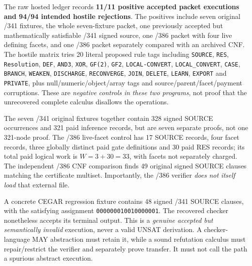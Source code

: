 \documentclass[11pt]{article}
\begin{document}
The raw hosted ledger records \textbf{11/11 positive accepted packet executions and 94/94 intended hostile rejections}. The positives include seven original /341 fixtures, the whole seven-fixture packet, one previously accepted but mathematically satisfiable /341 signed source, one /386 packet with four live defining facets, and one /386 packet separately compared with an archived CNF. The hostile matrix tries 20 literal proposed rule tags including \texttt{SOURCE}, \texttt{RES}, \texttt{Resolution}, \texttt{DEF}, \texttt{AND3}, \texttt{XOR}, \texttt{GF(2)}, \texttt{GF2}, \texttt{LOCAL-CONVERT}, \texttt{LOCAL\_CONVERT}, \texttt{CASE}, \texttt{BRANCH}, \texttt{WEAKEN}, \texttt{DISCHARGE}, \texttt{RECONVERGE}, \texttt{JOIN}, \texttt{DELETE}, \texttt{LEARN}, \texttt{EXPORT} and \texttt{PRIVATE}, plus null/numeric/object/array tags and source/parent/facet/payment corruptions. These are \emph{negative controls in these two programs}, not proof that the unrecovered complete calculus disallows the operations.

The seven /341 original fixtures together contain 328 signed SOURCE occurrences and 321 paid inference records, but are seven separate proofs, not one 321-node proof. The /386 live-facet control has 17 SOURCE records, four facet records, three globally distinct paid gate definitions and 30 paid RES records; its total paid logical work is \(W=3+30=33\), with facets not separately charged. The independent /386 CNF comparison finds 49 original signed SOURCE clauses matching the certificate multiset. Importantly, the /386 verifier \emph{does not itself load} that external file.

A concrete CEGAR regression fixture contains 48 signed /341 SOURCE clauses, with the satisfying assignment \texttt{000000010010000001}. The recovered checker nonetheless accepts its terminal output. This is a \emph{genuine accepted but semantically invalid} execution, never a valid UNSAT derivation. A checker-language MAY abstraction must retain it, while a sound refutation calculus must repair/restrict the verifier and separately prove transfer. It must not call the path a spurious abstract execution.
\end{document}
